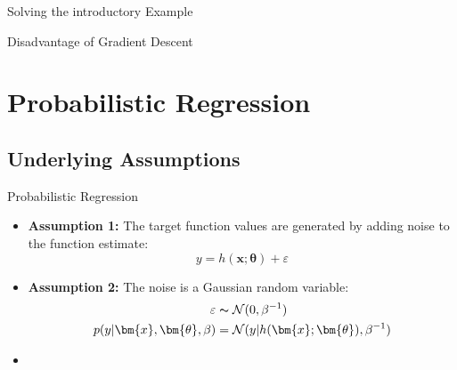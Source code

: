 \begin{frame}{Solving the introductory Example}{}
\end{frame}


\begin{frame}{Disadvantage of Gradient Descent}{}
	
\end{frame}


\section{Probabilistic Regression}

\subsection{Underlying Assumptions}

\begin{frame}{Probabilistic Regression}{}
	\begin{itemize}
		\item \textbf{Assumption 1:} The target function values are generated by adding noise to the function estimate:
		\begin{equation}
			y = h(\bm{x}; \bm{\theta}) + \varepsilon
		\end{equation}
		\item \textbf{Assumption 2:} The noise is a Gaussian random variable:
		\begin{align}
			\varepsilon &\thicksim \mathcal{N}(0, \beta^{-1}) \\
			p(y \vert \bm{x}, \bm{\theta}, \beta) &= \mathcal{N}(y \vert h(\bm{x}; \bm{\theta}), \beta^{-1})
		\end{align}
		\item {}
	\end{itemize}
\end{frame}


